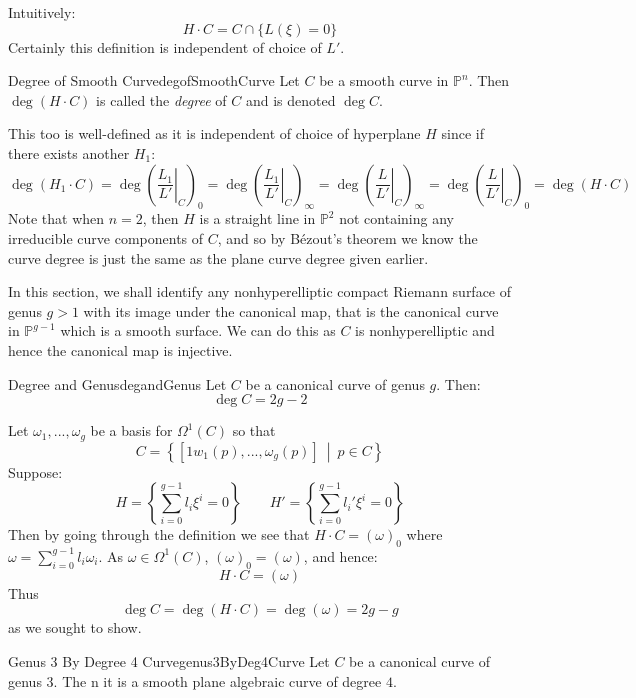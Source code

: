 \documentclass{book}
\renewcommand{\P}{{\mathbb{P}}}
\newcommand{\set}[2]{\left\{#1 \ \middle|\ #2\right\}}
\begin{document}
Intuitively:
\[
  H\cdot C = C\cap \{L(\xi) = 0\}
\]
Certainly this definition is independent of choice of $L'$.
\begin{defn}{Degree of Smooth Curve}{degofSmoothCurve}
  Let $C$ be a smooth curve in $\P^n$. Then $\deg(H\cdot C)$ is called the \emph{degree} of $C$ and is denoted
  $\deg C$.
\end{defn}

This too is well-defined as it is independent of choice of hyperplane $H$ since if there exists another $H_1$:
\[
  \deg (H_1\cdot C) = \deg \left(\left.\frac{L_1}{L'}\right|_C\right)_0 = \deg
    \left(\left.\frac{L_1}{L'}\right|_C\right)_\infty = \deg \left(\left.\frac{L}{L'}\right|_C\right)_\infty
        =\deg \left(\left.\frac{L}{L'}\right|_C\right)_0  = \deg(H\cdot C)
\]
Note that when $n = 2$, then $H$ is a straight line in $\P^2$ not containing any irreducible curve components
of $C$, and so by B\'ezout's theorem we know the curve degree is just the same as the plane curve degree given
earlier.

In this section, we shall identify any nonhyperelliptic compact Riemann surface of genus $g > 1$ with its
image under the canonical map, that is the canonical curve in $\P^{g-1}$ which is a smooth surface. We can
do this as $C$ is nonhyperelliptic and hence the canonical map is injective.

\begin{prop}{Degree and Genus}{degandGenus}
  Let $C$ be a canonical curve of genus $g$. Then:
  \[
    \deg C = 2g-2
  \]
\end{prop}

\begin{Proof}
  Let $\omega_1,..., \omega_g$ be a basis for $\Omega^1(C)$ so that
  \[
    C = \set{[1w_1(p), ..., \omega_g(p)]}{p \in C}
  \]
   Suppose:
   \[
     H = \left\{ \sum_{i=0}^{g-1} l_i\xi^i=0\right\} \qquad H' = \left\{ \sum_{i=0}^{g-1} l_i'\xi^i=0\right\}
   \]
   Then by going through the definition we see that  $H\cdot C = (\omega)_0$ where $\omega = \sum_{i=0}^{g-1}
   l_i\omega_i$. As $\omega \in \Omega^1(C)$, $(\omega)_0 = (\omega)$, and hence:
   \[
    H\cdot C = (\omega)
   \]
   Thus
   \[
    \deg C  =\deg(H\cdot C) = \deg(\omega) = 2g-g
   \]
   as we sought to show.
\end{Proof}

\begin{prop}{Genus 3 By Degree 4 Curve}{genus3ByDeg4Curve}
  Let $C$ be a canonical curve of genus $3$. The n it is a smooth plane algebraic curve of degree $4$.
\end{prop}
\end{document}
